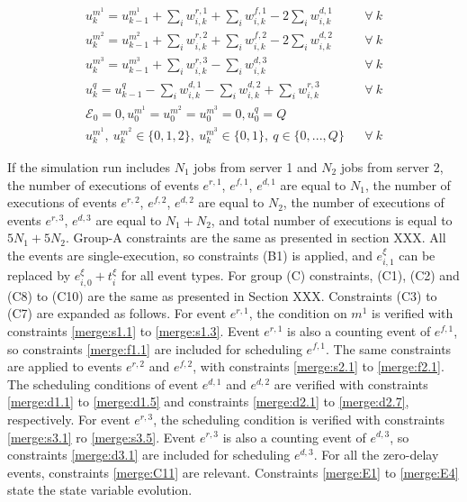 \documentclass[]{interact}
\theoremstyle{plain}%
\theoremstyle{definition}
\theoremstyle{remark}
\begin{document}
\begin{eqnarray}
u^{m^1}_k = u^{m^1}_{k-1} + \sum_{i}w^{r,1}_{i,k} + \sum_{i}w^{f,1}_{i,k}  - 2\sum_{i}w^{d,1}_{i,k} &&\forall\ k\label{merge:E1}\\
u^{m^2}_k = u^{m^2}_{k-1} +\sum_{i} w^{r,2}_{i,k}  + \sum_{i}w^{f,2}_{i,k}  - 2\sum_{i}w^{d,2}_{i,k}  &&\forall\ k\label{merge:E2}\\
u^{m^3}_k = u^{m^3}_{k-1} + \sum_{i}w^{r,3}_{i,k}  -  \sum_{i}w^{d,3}_{i,k}  &&\forall\ k\label{merge:E3}\\
u^q_k = u^{q}_{k-1} - \sum_{i}w^{d,1}_{i,k}  -\sum_{i}w^{d,2}_{i,k}  +\sum_{i} w^{r,3}_{i,k}   &&\forall\ k\label{merge:E4}\\
\mathcal{E}_0 = 0, u^{m^1}_0=u^{m^2}_0=u^{m^3}_0=0, u^q_0=Q\nonumber\\
u^{m^1}_k,\ u^{m^2}_k\in\{0,1,2\},\ u^{m^3}_k\in\{0,1\},\ q\in \{0,...,Q\}&& \forall\ k
\end{eqnarray}

If the simulation run includes $N_1$ jobs from server 1 and $N_2$ jobs from server 2, the number of executions of events $e^{r,1}$, $e^{f,1}$, $e^{d,1}$ are equal to $N_1$, the number of executions of events $e^{r,2}$, $e^{f,2}$, $e^{d,2}$ are equal to $N_2$, the number of executions of events $e^{r,3}$, $e^{d,3}$ are equal to $N_1+N_2$, and total number of executions is equal to $5N_1+5N_2$. Group-A constraints are the same as presented in section XXX. All the events are single-execution, so constraints (B1) is applied, and $e^{\xi}_{i,1}$ can be replaced by $e^{\xi}_{i,0}+t^{\xi}_i$ for all event types. For group (C) constraints, (C1), (C2) and (C8) to (C10) are the same as presented in Section XXX. Constraints (C3) to (C7) are expanded as follows. For event $e^{r,1}$, the condition on $m^1$ is verified with constraints \eqref{merge:s1.1} to \eqref{merge:s1.3}. Event $e^{r,1}$ is also a counting event of $e^{f,1}$, so constraints \eqref{merge:f1.1} are included for scheduling $e^{f,1}$. The same constraints are applied to events $e^{r,2}$ and $e^{f,2}$, with constraints \eqref{merge:s2.1} to \eqref{merge:f2.1}. The scheduling conditions of event $e^{d,1}$ and $e^{d,2}$ are verified with constraints \eqref{merge:d1.1} to \eqref{merge:d1.5} and constraints \eqref{merge:d2.1} to \eqref{merge:d2.7}, respectively. For event $e^{r,3}$, the scheduling condition is verified with constraints \eqref{merge:s3.1} ro \eqref{merge:s3.5}. Event $e^{r,3}$ is also a counting event of $e^{d,3}$, so constraints \eqref{merge:d3.1} are included for scheduling $e^{d,3}$. For all the zero-delay events, constraints \eqref{merge:C11} are relevant. Constraints \eqref{merge:E1} to \eqref{merge:E4} state the state variable evolution.
\end{document}

